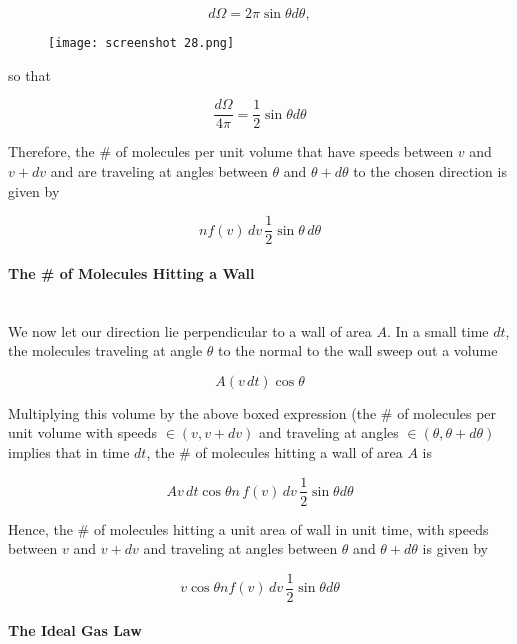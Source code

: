 \documentclass[svgnames]{article}     %
\begin{document}
\[
d\Omega = 2\pi\sin\theta d\theta, 
\] \vspace{5px}

\begin{figure}[H]
  \centering
    \texttt{[image: screenshot 28.png]}
\end{figure}



so that 

\[
\frac{d\Omega}{4\pi} = \frac{1}{2} \sin\theta d\theta
\] \vspace{5px}

Therefore, the \# of molecules per unit volume that have speeds between $v$ and
$v+dv$ and are traveling at angles between $\theta$ and $\theta + d\theta$ to
the chosen direction is given by 

\[
  \boxed{ nf(v) \, dv \, \frac{1}{2}\sin\theta\,d\theta}
\] \vspace{5px}

\paragraph{The \# of Molecules Hitting a Wall} \mbox{} \\

We now let our direction lie perpendicular to a wall of area $A$. In a small
time $dt$, the molecules traveling at angle $\theta$ to the normal to the wall
sweep out a volume

\[
A (v\,dt) \cos\theta
\] \vspace{5px}

Multiplying this volume by the above boxed expression (the \# of molecules per
unit volume with speeds $\in (v, v+dv)$ and traveling at angles $\in (\theta,
\theta + d\theta)$ implies that in time $dt$, the \# of molecules hitting
a wall of area $A$ is 

\[
A v\, dt \cos\theta n \, f(v) \, dv\, \frac{1}{2}\sin\theta d\theta
\] \vspace{5px}

Hence, the \# of molecules hitting a unit area of wall in unit time, with
speeds between $v$ and $v+dv$ and traveling at angles between $\theta$ and
$\theta + d\theta$ is given by

\[
  \boxed{v\cos\theta n f(v) \, dv \, \frac{1}{2}\sin\theta d\theta}
\] \vspace{5px}


\paragraph{The Ideal Gas Law}
\end{document}
